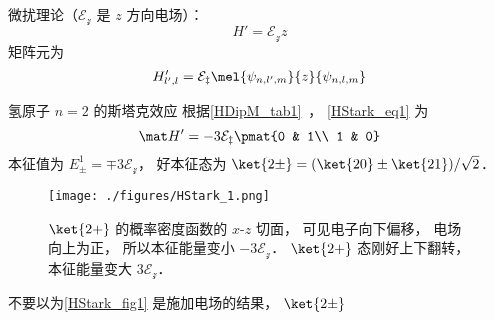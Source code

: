 
\begin{issues}
\issueDraft
\end{issues}


微扰理论（$\mathcal{E_z}$ 是 $z$ 方向电场）：
\begin{equation}
H' = \mathcal{E_z} z
\end{equation}
矩阵元为
\begin{equation}\label{HStark_eq1}
H'_{l',l} = \mathcal{E_z}\mel{\psi_{n,l',m}}{z}{\psi_{n,l,m}}
\end{equation}


\begin{example}{氢原子 $n=2$ 的斯塔克效应}
根据\autoref{HDipM_tab1}~， \autoref{HStark_eq1} 为
\begin{equation}
\mat H' = -3\mathcal{E_z}\pmat{0 & 1\\ 1 & 0}
\end{equation}
本征值为 $E_{\pm}^1 = \mp 3\mathcal{E_z}$， 好本征态为 $\ket{2\pm} = (\ket{20} \pm \ket{21})/{\sqrt 2}$．

\begin{figure}[ht]
\centering
\texttt{[image: ./figures/HStark\_1.png]}
\caption{$\ket{2+}$ 的概率密度函数的 $x$-$z$ 切面， 可见电子向下偏移， 电场向上为正， 所以本征能量变小 $-3\mathcal{E_z}$． $\ket{2+}$ 态刚好上下翻转， 本征能量变大 $3\mathcal{E_z}$．} \label{HStark_fig1}
\end{figure}

不要以为\autoref{HStark_fig1} 是施加电场的结果， $\ket{2\pm}$
\end{example}
